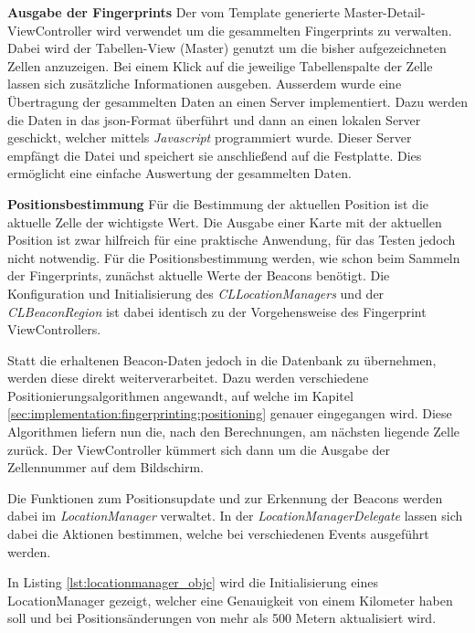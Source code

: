 \textbf{Ausgabe der Fingerprints}
Der vom Template generierte Master-Detail-ViewController wird verwendet um die gesammelten Fingerprints zu verwalten. Dabei wird der Tabellen-View (Master) genutzt um die bisher aufgezeichneten Zellen anzuzeigen. Bei einem Klick auf die jeweilige Tabellenspalte der Zelle lassen sich zusätzliche Informationen ausgeben.
Ausserdem wurde eine Übertragung der gesammelten Daten an einen Server implementiert. Dazu werden die Daten in das json-Format überführt und dann an einen lokalen Server geschickt, welcher mittels \emph{Javascript} programmiert wurde. Dieser Server empfängt die Datei und speichert sie anschließend auf die Festplatte. 
Dies ermöglicht eine einfache Auswertung der gesammelten Daten. 


\textbf{Positionsbestimmung}
Für die Bestimmung der aktuellen Position ist die aktuelle Zelle der wichtigste Wert. Die Ausgabe einer Karte mit der aktuellen Position ist zwar hilfreich für eine praktische Anwendung, für das Testen jedoch nicht notwendig.
Für die Positionsbestimmung werden, wie schon beim Sammeln der Fingerprints, zunächst aktuelle Werte der Beacons benötigt. Die Konfiguration und Initialisierung des \emph{CLLocationManagers} und der \emph{CLBeaconRegion} ist dabei identisch zu der Vorgehensweise des Fingerprint ViewControllers.

Statt die erhaltenen Beacon-Daten jedoch in die Datenbank zu übernehmen, werden diese direkt weiterverarbeitet. Dazu werden verschiedene Positionierungsalgorithmen angewandt, auf welche im Kapitel \ref{sec:implementation:fingerprinting:positioning} genauer eingegangen wird. 
Diese Algorithmen liefern nun die, nach den Berechnungen, am nächsten liegende Zelle zurück. Der ViewController kümmert sich dann um die Ausgabe der Zellennummer auf dem Bildschirm.



Die Funktionen zum Positionsupdate und zur Erkennung der Beacons werden dabei im \emph{LocationManager} verwaltet.
In der \emph{LocationManagerDelegate} lassen sich dabei die Aktionen bestimmen, welche bei verschiedenen Events ausgeführt werden.

In Listing \ref{lst:locationmanager_objc} wird die Initialisierung eines LocationManager gezeigt, welcher eine Genauigkeit von einem Kilometer haben soll und bei Positionsänderungen von mehr als 500 Metern aktualisiert wird.

